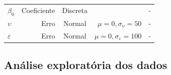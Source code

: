 \documentclass[
  a4paper, 11pt]{article}
\begin{document}
\begin{longtable}[]{@{}lrcrc@{}}
\begin{minipage}[t]{0.22\columnwidth}
\(\beta_{0}\)\strut
\end{minipage} & \begin{minipage}[t]{0.10\columnwidth}\raggedleft
Coeficiente\strut
\end{minipage} & \begin{minipage}[t]{0.10\columnwidth}\centering
Discreta\strut
\end{minipage} & \begin{minipage}[t]{0.25\columnwidth}\raggedleft
3000\strut
\end{minipage} & \begin{minipage}[t]{0.19\columnwidth}\centering
-\strut
\end{minipage}\tabularnewline
\begin{minipage}[t]{0.22\columnwidth}\raggedright
\(\upsilon\)\strut
\end{minipage} & \begin{minipage}[t]{0.10\columnwidth}\raggedleft
Erro\strut
\end{minipage} & \begin{minipage}[t]{0.10\columnwidth}\centering
Normal\strut
\end{minipage} & \begin{minipage}[t]{0.25\columnwidth}\raggedleft
\(\mu = 0, \sigma_\upsilon = 50\)\strut
\end{minipage} & \begin{minipage}[t]{0.19\columnwidth}\centering
-\strut
\end{minipage}\tabularnewline
\begin{minipage}[t]{0.22\columnwidth}\raggedright
\(\varepsilon\)\strut
\end{minipage} & \begin{minipage}[t]{0.10\columnwidth}\raggedleft
Erro\strut
\end{minipage} & \begin{minipage}[t]{0.10\columnwidth}\centering
Normal\strut
\end{minipage} & \begin{minipage}[t]{0.25\columnwidth}\raggedleft
\(\mu = 0, \sigma_\varepsilon = 100\)\strut
\end{minipage} & \begin{minipage}[t]{0.19\columnwidth}\centering
-\strut
\end{minipage}\tabularnewline
\bottomrule
\end{longtable}

\hypertarget{anuxe1lise-exploratuxf3ria-dos-dados}{%
\subsection{Análise exploratória dos
dados}\label{anuxe1lise-exploratuxf3ria-dos-dados}}
\end{document}
